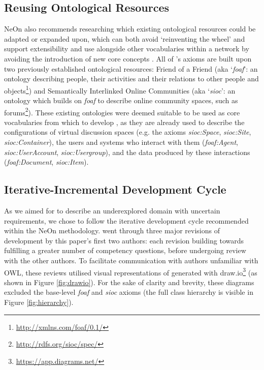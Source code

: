 \subsection{Reusing Ontological Resources}
NeOn also recommends researching which existing ontological resources could be adapted or expanded upon, which can both avoid `reinventing the wheel' \cite{suarez2012} and support extensibility and use alongside other vocabularies within a network by avoiding the introduction of new core concepts \cite{scherp2011}. All of \ONT{}'s axioms are built upon two previously established ontological resources: Friend of a Friend (aka `\textit{foaf}': an ontology describing people, their activities and their relations to other people and objects\footnote{\url{http://xmlns.com/foaf/0.1/}}) and Semantically Interlinked Online Communities (aka `\textit{sioc}': an ontology which builds on \textit{foaf} to describe online community spaces, such as forums\footnote{\url{http://rdfs.org/sioc/spec/}}). These existing ontologies were deemed suitable to be used as core vocabularies from which to develop \ONT{}, as they are already used to describe the configurations of virtual discussion spaces (e.g. the axioms \textit{sioc:Space}, \textit{sioc:Site}, \textit{sioc:Container}), the users and systems who interact with them (\textit{foaf:Agent}, \textit{sioc:UserAccount}, \textit{sioc:Usergroup}), and the data produced by these interactions (\textit{foaf:Document}, \textit{sioc:Item}).

\subsection{Iterative-Incremental Development Cycle}

As we aimed for \ONT{} to describe an underexplored domain with uncertain requirements, we chose to follow the iterative development cycle recommended within the NeOn methodology. \ONT{} went through three major revisions of development by this paper's first two authors: each revision building towards fulfilling a greater number of competency questions, before undergoing review with the other authors. To facilitate communication with authors unfamiliar with OWL, these reviews utilised visual representations of \ONT{} generated with draw.io\footnote{\url{https://app.diagrams.net/}} (as shown in Figure \ref{fig:drawio}). For the sake of clarity and brevity, these diagrams excluded the base-level \textit{foaf} and \textit{sioc} axioms (the full class hierarchy is visible in Figure \ref{fig:hierarchy}). 
